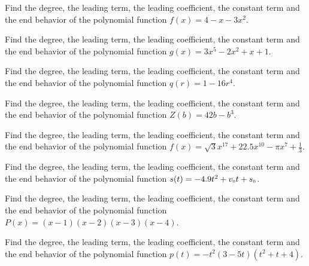 \documentclass{ximera}
\begin{document}

\begin{problem}\label{polyfactsfirst}
Find the degree, the leading term, the leading coefficient, the constant term and the end behavior of the polynomial function $f(x) = 4-x-3x^2$.  
\end{problem}

\begin{problem}
Find the degree, the leading term, the leading coefficient, the constant term and the end behavior of the polynomial function $g(x) = 3x^5 - 2x^2 + x + 1$.  
\end{problem}

\begin{problem}
Find the degree, the leading term, the leading coefficient, the constant term and the end behavior of the polynomial function $q(r) = 1 - 16r^{4}$.  
\end{problem}

\begin{problem}
Find the degree, the leading term, the leading coefficient, the constant term and the end behavior of the polynomial function $Z(b) = 42b - b^{3}$.  
\end{problem}

\begin{problem}
Find the degree, the leading term, the leading coefficient, the constant term and the end behavior of the polynomial function $f(x) = \sqrt{3}x^{17} + 22.5x^{10} - \pi x^{7} + \frac{1}{3}$.  
\end{problem}

\begin{problem}
Find the degree, the leading term, the leading coefficient, the constant term and the end behavior of the polynomial function $s(t) = -4.9t^{2} + v_{\mbox{\tiny $0$}}t + s_{\mbox{\tiny $0$}}$.  
\end{problem}

\begin{problem}
Find the degree, the leading term, the leading coefficient, the constant term and the end behavior of the polynomial function $P(x) = (x - 1)(x - 2)(x - 3)(x - 4)$.  
\end{problem}

\begin{problem}
Find the degree, the leading term, the leading coefficient, the constant term and the end behavior of the polynomial function $p(t) = -t^2(3 - 5t)(t^{2} + t + 4)$.  
\end{problem}
\end{document}
